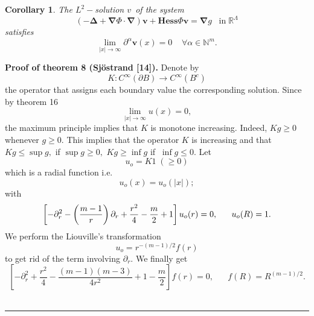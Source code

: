 \documentclass{article}
\newtheorem{corollary}[theorem]{Corollary}
\newenvironment{proof}[1][Proof]{\noindent\textbf{#1.} }{\ \rule{0.5em}{0.5em}}
\begin{document}
\begin{corollary}
\textit{The }$L^{2}-$\textit{solution }$v$\textit{\ of the system }%
\begin{equation}
\left( -\mathbf{\Delta }+\mathbf{\nabla }\Phi \cdot \mathbf{\nabla }\right) 
\mathbf{v}+\mathbf{Hess}\Phi \mathbf{v}=\mathbf{\nabla }g\;\;\;\text{in}\;%
\mathbb{R}^{\Lambda }
\end{equation}%
\textit{satisfies} 
\begin{equation}
\lim\limits_{\left| x\right| \rightarrow \infty }\partial ^{\alpha }\mathbf{v%
}(x)=0\;\;\;\;\forall \alpha \in \mathbb{N}^{m}.
\end{equation}
\end{corollary}

\begin{proof}[{Proof of theorem 8 (Sj\"{o}strand [14])}]
Denote by 
\begin{equation}
K:C^{\infty }(\partial B)\rightarrow C^{\infty }\left( B^{c}\right)
\end{equation}%
the operator that assigns each boundary value the corresponding solution.
Since by theorem 16%
\begin{equation}
\lim\limits_{\left| x\right| \rightarrow \infty }u(x)=0,
\end{equation}%
the maximum principle implies that $K$ is monotone increasing. Indeed, $%
Kg\geq 0$ whenever $g\geq 0.$ This implies that the operator $K$ is
increasing and that $Kg\leq \sup g,$ if $\sup g\geq 0,$ $Kg\geq \inf g$ if $%
\ \inf g\leq 0.$ Let 
\begin{equation}
u_{o}=K1\;\left( \geq 0\right)
\end{equation}%
which is a radial function i.e. 
\begin{equation}
u_{o}(x)=u_{o}(\left| x\right| );
\end{equation}%
with 
\begin{equation}
\left[ -\partial _{r}^{2}-\left( \dfrac{m-1}{r}\right) \partial _{r}+\dfrac{%
r^{2}}{4}-\dfrac{m}{2}+1\right] u_{o}(r)=0,\;\;\;\;\;\;u_{o}(R)=1.
\end{equation}%
We perform the Liouville's transformation 
\begin{equation}
u_{o}=r^{-(m-1)/2}f(r)
\end{equation}%
to get rid of the term involving $\partial _{r}.$ We finally get 
\begin{equation}
\left[ -\partial _{r}^{2}+\dfrac{r^{2}}{4}-\dfrac{\left( m-1\right) \left(
m-3\right) }{4r^{2}}+1-\dfrac{m}{2}\right] f(r)=0,\;\;\;\;\;%
\;f(R)=R^{(m-1)/2}.

\end{equation}
\end{proof}
\end{document}
